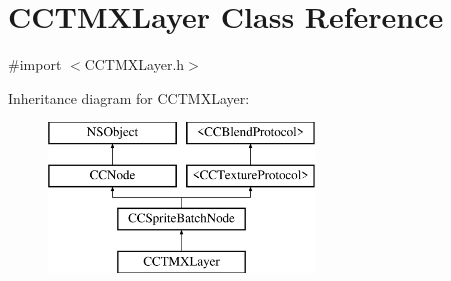 \hypertarget{interface_c_c_t_m_x_layer}{\section{C\-C\-T\-M\-X\-Layer Class Reference}
\label{interface_c_c_t_m_x_layer}
}


{\ttfamily \#import $<$C\-C\-T\-M\-X\-Layer.\-h$>$}

Inheritance diagram for C\-C\-T\-M\-X\-Layer\-:\begin{figure}[H]
\begin{center}
\leavevmode
\includegraphics[height=4.000000cm]{interface_c_c_t_m_x_layer}
\end{center}
\end{figure}
